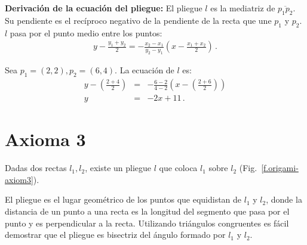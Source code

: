 \noindent\textbf{Derivación de la ecuación del pliegue:}
El pliegue $l$ es la mediatriz de $\overline{p_1p_2}$. Su pendiente es el recíproco negativo de la pendiente de la recta que une $p_1$ y $p_2$. $l$ pasa por el punto medio entre los puntos:
\begin{align}
y - \frac{y_1+y_2}{2} = -\frac{x_2-x_1}{y_2-y_1}\left(x-\frac{x_1+x_2}{2}\right)\,.\label{eq.midpoint1}
\end{align}

\begin{example}
Sea $p_1=(2,2), p_2=(6,4)$. La ecuación de $l$ es:
\begin{eqnarray*}
y-\left(\frac{2+4}{2}\right)&=&-\frac{6-2}{4-2}\left(x-\left(\frac{2+6}{2}\right)\right)\\
y&=&-2x+11\,.
\end{eqnarray*}
\end{example}



\section{Axioma 3}\label{s.ax3}

\begin{axiom}
Dadas dos rectas $l_1,l_2$, existe un pliegue $l$ que coloca $l_1$ sobre $l_2$ (Fig.~\ref{f.origami-axiom3}).
\end{axiom}

El pliegue es el lugar geométrico de los puntos que equidistan de $l_1$ y $l_2$, donde la distancia de un punto a una recta es la longitud del segmento que pasa por el punto y es perpendicular a la recta. Utilizando triángulos congruentes es fácil demostrar que el pliegue es bisectriz del ángulo formado por $l_1$ y $l_2$.


